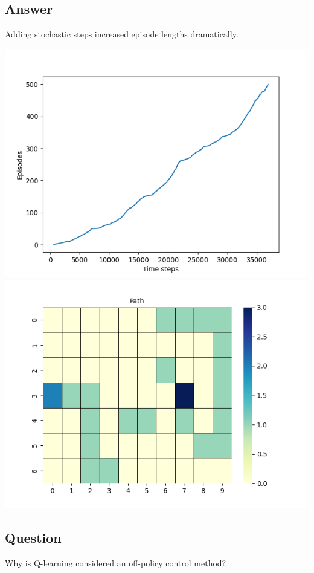 \documentclass[11pt]{article}
\begin{document}
    \subsection*{Answer}

    Adding stochastic steps increased episode lengths dramatically.

    \includegraphics[scale=0.4]{figure_6_3_ex_6_10}
    \includegraphics[scale=0.4]{figure_6_3_ex_6_10_grid}

    \subsection{Question}

    Why is Q-learning considered an off-policy control method?
\end{document}
